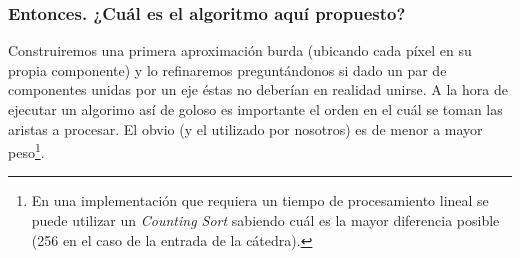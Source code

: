 \subsubsection{Entonces. ¿Cuál es el algoritmo aquí propuesto?}

Construiremos una primera aproximación burda (ubicando cada píxel en su propia
componente) y lo refinaremos preguntándonos si dado un par de componentes
unidas por un eje éstas no deberían en realidad unirse. A la hora de ejecutar
un algorimo así de goloso es importante el orden en el cuál se toman las
aristas a procesar. El obvio (y el utilizado por nosotros) es de menor a mayor
peso\footnote{En una implementación que requiera un tiempo de procesamiento
lineal se puede utilizar un \emph{Counting Sort} sabiendo cuál es la mayor
diferencia posible (256 en el caso de la entrada de la cátedra).}.

